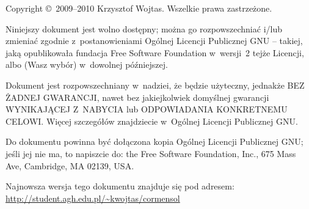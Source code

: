 		\vspace{10ex}

		\begin{small}
			Copyright \copyright\ 2009--2010 Krzysztof Wojtas. Wszelkie prawa zastrzeżone.

			Niniejszy dokument jest wolno dostępny; można go rozpowszechniać i/lub zmieniać zgodnie z~postanowieniami Ogólnej Licencji Publicznej GNU -- takiej, jaką opublikowała fundacja Free Software Foundation w~wersji~2 tejże Licencji, albo (Wasz wybór) w~dowolnej późniejszej.

			Dokument jest rozpowszechniany w~nadziei, że będzie użyteczny, jednakże BEZ ŻADNEJ GWARANCJI, nawet bez jakiejkolwiek domyślnej gwarancji WYNIKAJĄCEJ Z~NABYCIA lub ODPOWIADANIA KONKRETNEMU CELOWI. Więcej szczegółów znajdziecie w~Ogólnej Licencji Publicznej GNU.

			Do dokumentu powinna być dołączona kopia Ogólnej Licencji Publicznej GNU; jeśli jej nie ma, to napiszcie do: the Free Software Foundation, Inc., 675 Mass Ave, Cambridge, MA 02139, USA.
		\end{small}

	\endgroup


	\noindent Najnowsza wersja tego dokumentu znajduje się pod adresem:\\
	\url{http://student.agh.edu.pl/~kwojtas/cormensol}

	\newpage

\endgroup

\endinput
